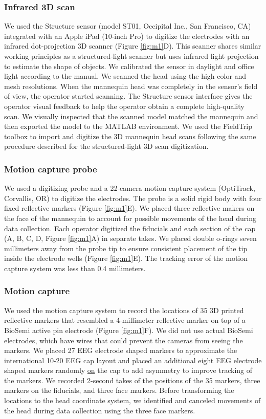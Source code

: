 \documentclass[../thesis_seyed.tex]{subfiles}
\begin{document}
\subsubsection{Infrared 3D scan}
We used the Structure sensor (model ST01, Occipital Inc., San Francisco, CA) integrated with an Apple\tss{\textregistered} iPad (10-inch Pro) to digitize the electrodes with an infrared dot-projection 3D scanner (Figure \ref{fig:m1}D). This scanner shares similar working principles as a structured-light scanner but uses infrared light projection to estimate the shape of objects. We calibrated the sensor in daylight and office light according to the manual. We scanned the head using the high color and mesh resolutions. When the mannequin head was completely in the sensor's field of view, the operator started scanning. The Structure sensor interface gives the operator visual feedback to help the operator obtain a complete high-quality scan. We visually inspected that the scanned model matched the mannequin and then exported the model to the MATLAB environment. We used the FieldTrip toolbox to import and digitize the 3D mannequin head scans following the same procedure described for the structured-light 3D scan digitization. 

\subsubsection{Motion capture probe}
We used a digitizing probe and a 22-camera motion capture system (OptiTrack, Corvallis, OR) to digitize the electrodes. The probe is a solid rigid body with four fixed reflective markers (Figure \ref{fig:m1}E). We placed three reflective makers on the face of the mannequin to account for possible movements of the head during data collection. Each operator digitized the fiducials and each section of the cap (A, B, C, D, Figure \ref{fig:m1}A) in separate takes. We placed double o-rings seven millimeters away from the probe tip to ensure consistent placement of the tip inside the electrode wells (Figure \ref{fig:m1}E). The tracking error of the motion capture system was less than 0.4 millimeters. 

\subsubsection{Motion capture}
We used the motion capture system to record the locations of 35 3D printed reflective markers that resembled a 4-millimeter reflective marker on top of a BioSemi active pin electrode (Figure \ref{fig:m1}F). We did not use actual BioSemi electrodes, which have wires that could prevent the cameras from seeing the markers. We placed 27 EEG electrode shaped markers to approximate the international 10-20 EEG cap layout and placed an additional eight EEG electrode shaped markers randomly \ul{on} the cap to add asymmetry to improve tracking of the markers. We recorded 2-second takes of the positions of the 35 markers, three markers on the fiducials, and three face markers. Before transforming the locations to the head coordinate system, we identified and canceled movements of the head during data collection using the three face markers.
\end{document}
